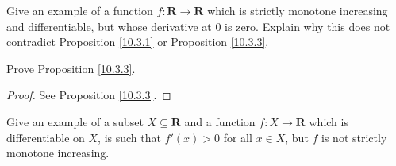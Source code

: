 \begin{exercise}\label{ex 10.3.3}
    Give an example of a function \(f : \mathbf{R} \to \mathbf{R}\) which is strictly monotone increasing and differentiable, but whose derivative at \(0\) is zero.
    Explain why this does not contradict Proposition \ref{10.3.1} or Proposition \ref{10.3.3}.
\end{exercise}

\begin{exercise}\label{ex 10.3.4}
    Prove Proposition \ref{10.3.3}.
\end{exercise}

\begin{proof}
    See Proposition \ref{10.3.3}.
\end{proof}

\begin{exercise}\label{ex 10.3.5}
    Give an example of a subset \(X \subseteq \mathbf{R}\) and a function \(f : X \to \mathbf{R}\) which is differentiable on \(X\), is such that \(f'(x) > 0\) for all \(x \in X\), but \(f\) is not strictly monotone increasing.
\end{exercise}